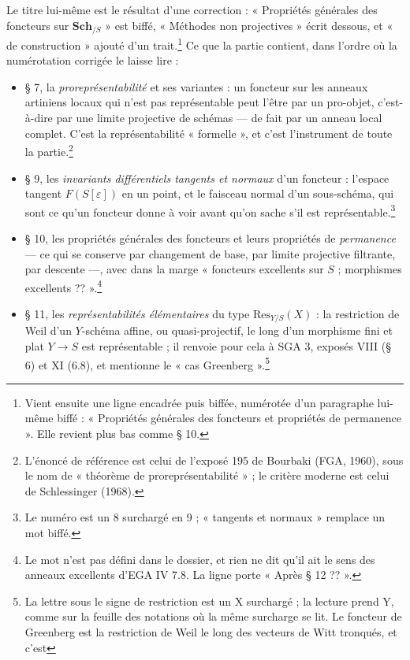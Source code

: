 \documentclass[11pt,a4paper]{article}
\begin{document}
Le titre lui-même est le résultat d'une correction : « Propriétés générales
des foncteurs sur $\mathbf{Sch}_{/S}$ » est biffé, « Méthodes non
projectives » écrit dessous, et « de construction » ajouté d'un
trait.\footnote{Vient ensuite une ligne encadrée puis biffée, numérotée d'un
paragraphe lui-même biffé : « Propriétés générales des foncteurs et
propriétés de permanence ». Elle revient plus bas comme § 10.} Ce que la
partie contient, dans l'ordre où la numérotation corrigée le laisse
lire :

\begin{itemize}
  \item § 7, la \emph{proreprésentabilité} et ses variantes : un foncteur
  sur les anneaux artiniens locaux qui n'est pas représentable peut l'être
  par un pro-objet, c'est-à-dire par une limite projective de schémas — de
  fait par un anneau local complet. C'est la représentabilité
  « formelle », et c'est l'instrument de toute la partie.\footnote{L'énoncé de
  référence est celui de l'exposé 195 de Bourbaki (FGA, 1960), sous le nom
  de « théorème de proreprésentabilité » ; le critère moderne est celui de
  Schlessinger (1968).}
  \item § 9, les \emph{invariants différentiels tangents et normaux} d'un
  foncteur : l'espace tangent $F(S[\varepsilon])$ en un point, et le
  faisceau normal d'un sous-schéma, qui sont ce qu'un foncteur donne à voir
  avant qu'on sache s'il est représentable.\footnote{Le numéro est un 8
  surchargé en 9 ; « tangents et normaux » remplace un mot biffé.}
  \item § 10, les propriétés générales des foncteurs et leurs propriétés de
  \emph{permanence} — ce qui se conserve par changement de base, par limite
  projective filtrante, par descente —, avec dans la marge « foncteurs
  excellents sur $S$ ; morphismes excellents ?? ».\footnote{Le mot n'est pas
  défini dans le dossier, et rien ne dit qu'il ait le sens des anneaux
  excellents d'EGA IV 7.8. La ligne porte « Après § 12 ?? ».}
  \item § 11, les \emph{représentabilités élémentaires} du type
  $\mathrm{Res}_{Y/S}(X)$ : la restriction de Weil d'un $Y$-schéma affine, ou
  quasi-projectif, le long d'un morphisme fini et plat $Y \to S$ est
  représentable ; il renvoie pour cela à SGA 3, exposés VIII (§ 6) et XI
  (6.8), et mentionne le « cas Greenberg ».\footnote{La lettre sous le
  signe de restriction est un X surchargé ; la lecture prend Y, comme sur la
  feuille des notations où la même surcharge se lit. Le foncteur de Greenberg
  est la restriction de Weil le long des vecteurs de Witt tronqués, et c'est
}
\end{itemize}
\end{document}
